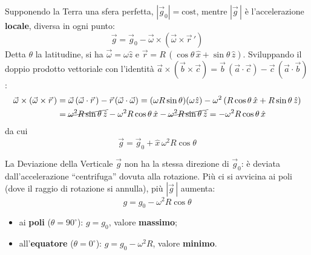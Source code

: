 Supponendo la Terra una sfera perfetta, $|\vec{g}_0| = \text{cost}$, mentre $|\vec{g}\,|$ è l'accelerazione \textbf{locale}, diversa in ogni punto:
\begin{equation}
    \vec{g} = \vec{g}_0 - \vec{\omega}\times(\vec{\omega}\times\vec{r}\,')
\end{equation}
Detta $\theta$ la latitudine, si ha $\vec{\omega} = \omega\hat{z}$ e $\vec{r} = R\,(\cos\theta\,\hat{x} + \sin\theta\,\hat{z})$. Sviluppando il doppio prodotto vettoriale con l'identità $\vec{a}\times(\vec{b}\times\vec{c}) = \vec{b}\,(\vec{a}\cdot\vec{c}) - \vec{c}\,(\vec{a}\cdot\vec{b})$:
\begin{align*}
    \vec{\omega}\times(\vec{\omega}\times\vec{r}\,) &= \vec{\omega}\,(\vec{\omega}\cdot\vec{r}\,) - \vec{r}\,(\vec{\omega}\cdot\vec{\omega})
      = (\omega R \sin\theta)(\omega\hat{z}) - \omega^2\left(R\cos\theta\,\hat{x} + R\sin\theta\,\hat{z}\right) \\
      &= \cancel{\omega^2 R \sin\theta\,\hat{z}} - \omega^2 R\cos\theta\,\hat{x} - \cancel{\omega^2 R\sin\theta\,\hat{z}}
      = -\omega^2 R \cos\theta\,\hat{x}
\end{align*}
da cui
\begin{equation}
    \boxed{\;\vec{g} = \vec{g}_0 + \hat{x}\,\omega^2 R \cos\theta\;}
\end{equation}

\begin{osservazione}{La Deviazione della Verticale}
$\vec{g}$ non ha la stessa direzione di $\vec{g}_0$: è deviata dall'accelerazione ``centrifuga'' dovuta alla rotazione. Più ci si avvicina ai poli (dove il raggio di rotazione si annulla), più $|\vec{g}\,|$ aumenta:
\begin{equation*}
    g = g_0 - \omega^2 R\cos\theta
\end{equation*}
\begin{itemize}[leftmargin=1.4em]
    \item ai \textbf{poli} ($\theta = 90^{\circ}$): $g = g_0$, valore \textbf{massimo};
    \item all'\textbf{equatore} ($\theta = 0^{\circ}$): $g = g_0 - \omega^2 R$, valore \textbf{minimo}.
\end{itemize}
\end{osservazione}

